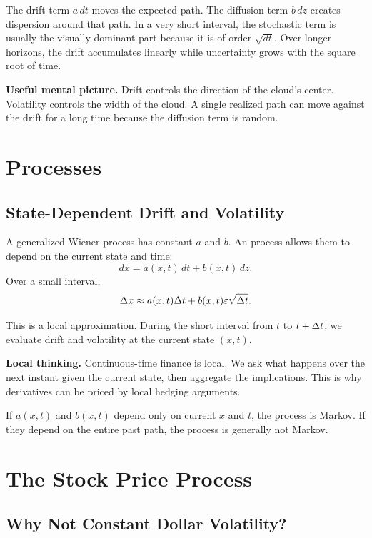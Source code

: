 The drift term $a\,dt$ moves the expected path. The diffusion term $b\,dz$
creates dispersion around that path. In a very short interval, the stochastic
term is usually the visually dominant part because it is of order $\sqrt{dt}$.
Over longer horizons, the drift accumulates linearly while uncertainty grows
with the square root of time.

\begin{boxD}
\textbf{Useful mental picture.} Drift controls the direction of the cloud's
center. Volatility controls the width of the cloud. A single realized path can
move against the drift for a long time because the diffusion term is random.
\end{boxD}

\section{\Ito Processes}

\subsection{State-Dependent Drift and Volatility}

A generalized Wiener process has constant $a$ and $b$. An \Ito process allows
them to depend on the current state and time:
\[
    dx = a(x,t)\,dt + b(x,t)\,dz.
\]
Over a small interval,
\[
    \Delta x
    \approx
    a(x,t)\Delta t + b(x,t)\varepsilon\sqrt{\Delta t}.
\]

This is a local approximation. During the short interval from $t$ to $t+\Delta t$,
we evaluate drift and volatility at the current state $(x,t)$.

\begin{boxF}
\textbf{Local thinking.} Continuous-time finance is local. We ask what happens
over the next instant given the current state, then aggregate the implications.
This is why derivatives can be priced by local hedging arguments.
\end{boxF}

If $a(x,t)$ and $b(x,t)$ depend only on current $x$ and $t$, the process is
Markov. If they depend on the entire past path, the process is generally not
Markov.

\section{The Stock Price Process}

\subsection{Why Not Constant Dollar Volatility?}

